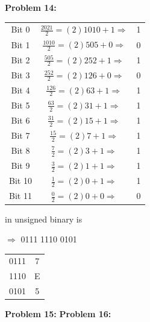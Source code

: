 \documentclass{article}
\begin{document}
    \quad\quad
    \noindent{}

    \textbf{Problem 14:}

    \begin{center}
        \begin{tabular}{ c|c c }
            Bit 0 & $\frac{2021}{2} = (2)1010 + 1 \Rightarrow$ & 1 \\
            Bit 1 & $\frac{1010}{2} = (2)505 + 0 \Rightarrow$ & 0 \\
            Bit 2 & $\frac{505}{2} = (2)252 + 1 \Rightarrow$ & 1 \\
            Bit 3 & $\frac{252}{2} = (2)126 + 0 \Rightarrow$ & 0 \\
            Bit 4 & $\frac{126}{2} = (2)63 + 1 \Rightarrow$ & 1 \\
            Bit 5 & $\frac{63}{2} = (2)31 + 1 \Rightarrow$ & 1 \\
            Bit 6 & $\frac{31}{2} = (2)15 + 1 \Rightarrow$ & 1 \\
            Bit 7 & $\frac{15}{2} = (2)7 + 1 \Rightarrow$ & 1 \\
            Bit 8 & $\frac{7}{2} = (2)3 + 1 \Rightarrow$ & 1 \\
            Bit 9 & $\frac{3}{2} = (2)1 + 1 \Rightarrow$ & 1 \\
            Bit 10 & $\frac{1}{2} = (2)0 + 1 \Rightarrow$ & 1 \\
            Bit 11 & $\frac{0}{2} = (2)0 + 0 \Rightarrow$ & 0
        \end{tabular}
    \end{center}

    \quad{} in unsigned binary is 

    \quad{} $\Rightarrow$ 0111 1110 0101

    \begin{center}
        \begin{tabular}{ c|c }
            0111 & 7 \\
            1110 & E \\
            0101 & 5 
        \end{tabular}
    \end{center}

    \quad\quad {}

    \textbf{Problem 15:}
    \textbf{Problem 16:}
    
\end{document}
